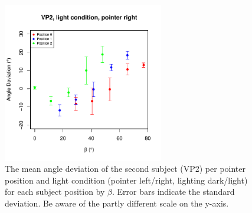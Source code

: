 \begin{figure}
    \includegraphics[width = 7cm]{Images/plots/AngleDevVP2LightRight.pdf}
    \caption{The mean angle deviation of the second subject (VP2) per pointer position and light condition (pointer left/right, lighting dark/light) for each subject position by $\beta$. Error bars indicate the standard deviation. Be aware of the partly different scale on the y-axis.} 
    \label{DeviationVP2}
    
\end{figure}
